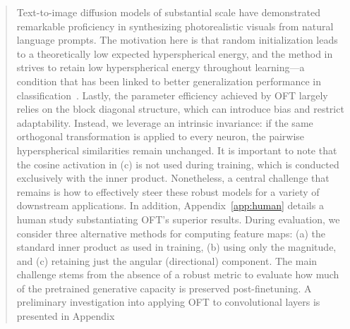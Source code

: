 \begin{itemize}[leftmargin=*,nosep]
\begin{abstract}
Text-to-image diffusion models of substantial scale have demonstrated remarkable proficiency in synthesizing photorealistic visuals from natural language prompts. The motivation here is that random initialization leads to a theoretically low expected hyperspherical energy, and the method in \cite{liu2021orthogonal} strives to retain low hyperspherical energy throughout learning—a condition that has been linked to better generalization performance in classification~\cite{liu2018learning,lin2020regularizing}. Lastly, the parameter efficiency achieved by OFT largely relies on the block diagonal structure, which can introduce bias and restrict adaptability. Instead, we leverage an intrinsic invariance: if the same orthogonal transformation is applied to every neuron, the pairwise hyperspherical similarities remain unchanged. It is important to note that the cosine activation in (c) is not used during training, which is conducted exclusively with the inner product. Nonetheless, a central challenge that remains is how to effectively steer these robust models for a variety of downstream applications. In addition, Appendix~\ref{app:human} details a human study substantiating OFT’s superior results. During evaluation, we consider three alternative methods for computing feature maps: (a) the standard inner product as used in training, (b) using only the magnitude, and (c) retaining just the angular (directional) component. The main challenge stems from the absence of a robust metric to evaluate how much of the pretrained generative capacity is preserved post-finetuning. A preliminary investigation into applying OFT to convolutional layers is presented in Appendix~


\end{abstract}
\end{itemize}

